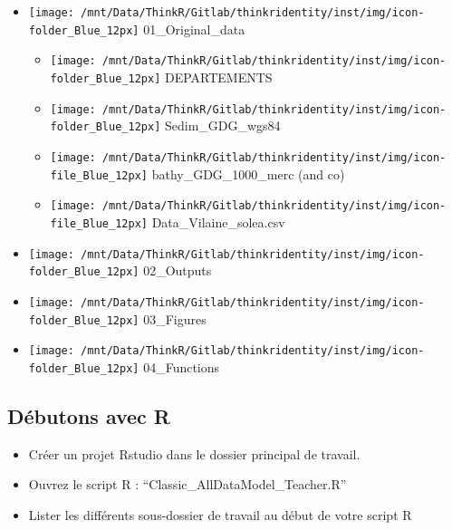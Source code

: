 \documentclass[french,a4paper]{article}
\providecommand{\tightlist}{%
  \setlength{\itemsep}{0pt}\setlength{\parskip}{0pt}}
\begin{document}
\begin{itemize}
\tightlist
\item
  \texttt{[image: /mnt/Data/ThinkR/Gitlab/thinkridentity/inst/img/icon-folder\_Blue\_12px]} 01\_Original\_data

  \begin{itemize}
  \tightlist
  \item
    \texttt{[image: /mnt/Data/ThinkR/Gitlab/thinkridentity/inst/img/icon-folder\_Blue\_12px]} DEPARTEMENTS
  \item
    \texttt{[image: /mnt/Data/ThinkR/Gitlab/thinkridentity/inst/img/icon-folder\_Blue\_12px]} Sedim\_GDG\_wgs84
  \item
    \texttt{[image: /mnt/Data/ThinkR/Gitlab/thinkridentity/inst/img/icon-file\_Blue\_12px]} bathy\_GDG\_1000\_merc (and co)
  \item
    \texttt{[image: /mnt/Data/ThinkR/Gitlab/thinkridentity/inst/img/icon-file\_Blue\_12px]} Data\_Vilaine\_solea.csv
  \end{itemize}
\item
  \texttt{[image: /mnt/Data/ThinkR/Gitlab/thinkridentity/inst/img/icon-folder\_Blue\_12px]} 02\_Outputs
\item
  \texttt{[image: /mnt/Data/ThinkR/Gitlab/thinkridentity/inst/img/icon-folder\_Blue\_12px]} 03\_Figures
\item
  \texttt{[image: /mnt/Data/ThinkR/Gitlab/thinkridentity/inst/img/icon-folder\_Blue\_12px]} 04\_Functions
\end{itemize}

\hypertarget{debutons-avec-r}{%
\subsection{Débutons avec R}\label{debutons-avec-r}}

\begin{itemize}
\tightlist
\item
  Créer un projet Rstudio dans le dossier principal de travail.
\item
  Ouvrez le script R : ``Classic\_AllDataModel\_Teacher.R''
\item
  Lister les différents sous-dossier de travail au début de votre script R
\end{itemize}
\end{document}
